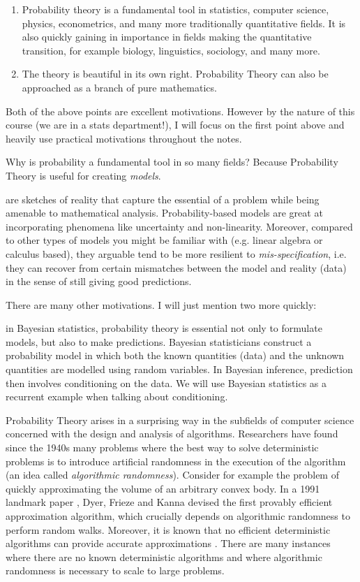 \documentclass{article}
\begin{document}
\begin{enumerate}
	\item Probability theory is a fundamental tool in statistics, computer science, physics, econometrics, and many more traditionally quantitative fields. It is also quickly gaining in importance in fields making the quantitative transition, for example biology, linguistics, sociology, and many more. 
	\item The theory is beautiful in its own right. Probability Theory can also be approached as a branch of pure mathematics. 
\end{enumerate}
 
Both of the above points are excellent motivations. However by the nature of this course (we are in a stats department!), I will focus on the first point above and heavily use practical motivations throughout the notes. 

Why is probability a fundamental tool in so many fields? Because Probability Theory is useful for creating \emph{models}. 

 are sketches of reality that capture the essential of a problem while being amenable to mathematical analysis. Probability-based models are great at incorporating phenomena like uncertainty and non-linearity. Moreover, compared to other types of models you might be familiar with (e.g. linear algebra or calculus based), they arguable tend to be more resilient to \emph{mis-specification}, i.e. they can recover from certain mismatches between the model and reality (data) in the sense of still giving good predictions.

There are many other motivations. I will just mention two more quickly:

 in Bayesian statistics, probability theory is essential not only to formulate models, but also to make predictions. Bayesian statisticians construct a probability model in which both the known quantities (data) and the unknown quantities are modelled using random variables. In Bayesian inference, prediction then involves  conditioning on the data.  We will use Bayesian statistics as a recurrent example when talking about conditioning. 

  Probability Theory arises in a surprising way in the subfields of computer science concerned with the design and analysis of algorithms. Researchers have found since the 1940s many problems where the best way to solve deterministic problems is to introduce artificial randomness in the execution of the algorithm (an idea called \emph{algorithmic randomness}). Consider for example the problem of quickly approximating the volume of an arbitrary convex body. In a 1991 landmark paper \cite{dyer_random_1991}, Dyer, Frieze and Kanna devised the first provably efficient approximation algorithm, which crucially depends on algorithmic randomness to perform random walks. Moreover, it is known that no efficient deterministic algorithms can provide accurate approximations \cite{bfirfiny_computing_nodate}. There are many instances where there are no known deterministic algorithms and where algorithmic randomness is necessary to scale to large problems.  
\end{document}
